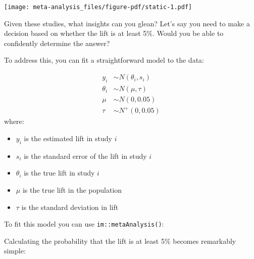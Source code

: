 \documentclass[
  letterpaper,
  DIV=11,
  numbers=noendperiod]{scrreprt}
\newenvironment{Shaded}{\begin{snugshade}}{\end{snugshade}}
\newcommand{\AttributeTok}[1]{\textcolor[rgb]{0.40,0.45,0.13}{#1}}
\newcommand{\FloatTok}[1]{\textcolor[rgb]{0.68,0.00,0.00}{#1}}
\newcommand{\FunctionTok}[1]{\textcolor[rgb]{0.28,0.35,0.67}{#1}}
\newcommand{\NormalTok}[1]{\textcolor[rgb]{0.00,0.23,0.31}{#1}}
\newcommand{\OtherTok}[1]{\textcolor[rgb]{0.00,0.23,0.31}{#1}}
\newcommand{\SpecialCharTok}[1]{\textcolor[rgb]{0.37,0.37,0.37}{#1}}
\begin{document}
\texttt{[image: meta-analysis\_files/figure-pdf/static-1.pdf]}

Given these studies, what insights can you glean? Let's say you need to
make a decision based on whether the lift is at least 5\%. Would you be
able to confidently determine the answer?

To address this, you can fit a straightforward model to the data:

\[
\begin{aligned}
y_i &\sim N(\theta_i,s_i)  \\
\theta_i &\sim N(\mu, \tau) \\
\mu &\sim N(0, 0.05) \\
\tau &\sim N^+(0, 0.05) 
\end{aligned}
\] where:

\begin{itemize}
\item
  \(y_i\) is the estimated lift in study \(i\)
\item
  \(s_i\) is the standard error of the lift in study \(i\)
\item
  \(\theta_i\) is the true lift in study \(i\)
\item
  \(\mu\) is the true lift in the population
\item
  \(\tau\) is the standard deviation in lift
\end{itemize}

To fit this model you can use \texttt{im::metaAnalysis()}:

\begin{Shaded}
\end{Shaded}

Calculating the probability that the lift is at least 5\% becomes
remarkably simple:

\begin{Shaded}
\end{Shaded}
\end{document}
